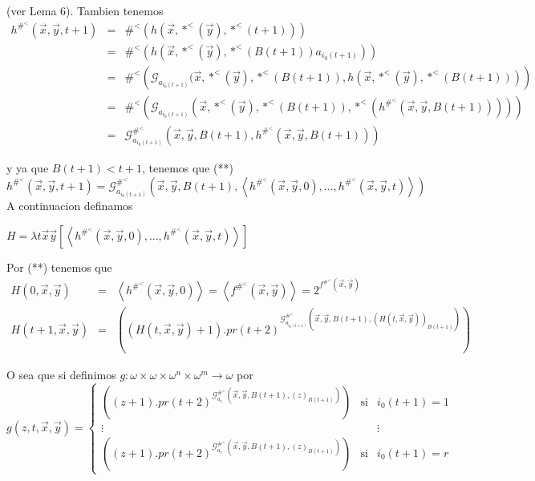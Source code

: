 (ver Lema 6). Tambien tenemos
\(\displaystyle \begin{array}{rcl} h^{\#^{< }}(\vec{x},\vec{y},t+1) & =& \#^{< }(h(\vec{x},\ast ^{< }(\vec{y}),\ast ^{< }(t+1))) \\ & =& \#^{< }(h(\vec{x},\ast ^{< }(\vec{y}),\ast ^{< }(B(t+1))a_{i_{0}(t+1)})) \\ & =& \#^{< }\left( \mathcal{G}_{a_{i_{0}(t+1)}}(\vec{x},\ast ^{< }(\vec{y}),\ast ^{< }(B(t+1)),h(\vec{x},\ast ^{< }(\vec{y}),\ast ^{< }(B(t+1)))\right) \\ & =& \#^{< }\left( \mathcal{G}_{a_{i_{0}(t+1)}}(\vec{x},\ast ^{< }(\vec{y}),\ast ^{< }(B(t+1)),\ast ^{< }(h^{\#^{< }}(\vec{x},\vec{y},B(t+1))))\right) \\ & =& \mathcal{G}_{a_{i_{0}(t+1)}}^{\#^{< }}(\vec{x},\vec{y},B(t+1),h^{\#^{< }}( \vec{x},\vec{y},B(t+1))) \end{array} \)

y ya que \(B(t+1)< t+1\), tenemos que
(**) \(h^{\#^{< }}(\vec{x},\vec{y},t+1)=\mathcal{G}_{a_{i_{0}(t+1)}}^{ \#^{< }}(\vec{x},\vec{y},B(t+1),\left\langle h^{\#^{< }}(\vec{x},\vec{y} ,0),...,h^{\#^{< }}(\vec{x},\vec{y},t)\right\rangle )\)
A continuacion definamos

\(\displaystyle H=\lambda t\vec{x}\vec{y}\left[ \left\langle h^{\#^{< }}(\vec{x},\vec{y} ,0),...,h^{\#^{< }}(\vec{x},\vec{y},t)\right\rangle \right] \)

Por (**) tenemos que
\(\displaystyle \begin{array}{rcl} H(0,\vec{x},\vec{y}) & =& \left\langle h^{\#^{< }}(\vec{x},\vec{y} ,0)\right\rangle =\left\langle f^{\#^{< }}(\vec{x},\vec{y})\right\rangle =2^{f^{\#^{< }}(\vec{x},\vec{y})} \\ H(t+1,\vec{x},\vec{y}) & =& \left( (H(t,\vec{x},\vec{y})+1).pr(t+2)^{\mathcal{G }_{a_{i_{0}(t+1)}}^{\#^{< }}(\vec{x},\vec{y},B(t+1),(H(t,\vec{x},\vec{y} ))_{B(t+1)})}\right) \end{array} \)

O sea que si definimos \(g:\omega \times \omega \times \omega ^{n}\times \omega ^{m}\rightarrow \omega \) por
\(\displaystyle g(z,t,\vec{x},\vec{y})=\left\{ \begin{array}{clc} \left( (z+1).pr(t+2)^{\mathcal{G}_{a_{1}}^{\#^{< }}(\vec{x},\vec{y} ,B(t+1),(z)_{B(t+1)})}\right) & \text{si} & i_{0}(t+1)=1 \\ \vdots & & \vdots \\ \left( (z+1).pr(t+2)^{\mathcal{G}_{a_{r}}^{\#^{< }}(\vec{x},\vec{y} ,B(t+1),(z)_{B(t+1)})}\right) & \text{si} & i_{0}(t+1)=r \end{array} \right. \)


